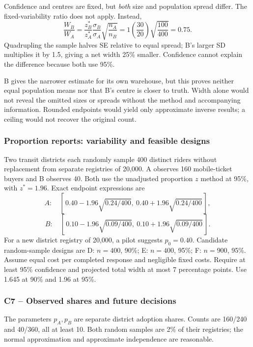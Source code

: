 Confidence and centres are fixed, but \emph{both} size and population spread differ. The fixed-variability ratio does not apply. Instead,
\[\frac{W_B}{W_A}=\frac{z_B^*}{z_A^*}\frac{\sigma_B}{\sigma_A}\sqrt{\frac{n_A}{n_B}}
=1\left(\frac{30}{20}\right)\sqrt{\frac{100}{400}}=0.75.\]
Quadrupling the sample halves SE relative to equal spread; B's larger SD multiplies it by 1.5, giving a net width 25\% smaller. Confidence cannot explain the difference because both use 95\%.

B gives the narrower estimate for its own warehouse, but this proves neither equal population means nor that B's centre is closer to truth. Width alone would not reveal the omitted sizes or spreads without the method and accompanying information. Rounded endpoints would yield only approximate inverse results; a ceiling would not recover the original count.
\clearpage
\subsubsection{Proportion reports: variability and feasible designs}\label{prob:c7-report-prop}
Two transit districts each randomly sample 400 distinct riders without replacement from separate registries of 20,000. A observes 160 mobile-ticket buyers and B observes 40. Both use the unadjusted proportion $z$ method at 95\%, with $z^*=1.96$. Exact endpoint expressions are
\[A:\quad [\,0.40-1.96\sqrt{0.24/400},\ 0.40+1.96\sqrt{0.24/400}\,],\]
\[B:\quad [\,0.10-1.96\sqrt{0.09/400},\ 0.10+1.96\sqrt{0.09/400}\,].\]
For a new district registry of 20,000, a pilot suggests $p_0=0.40$. Candidate random-sample designs are D: $n=400$, 90\%; E: $n=400$, 95\%; F: $n=900$, 95\%. Assume equal cost per completed response and negligible fixed costs. Require at least 95\% confidence and projected total width at most 7 percentage points. Use 1.645 at 90\% and 1.96 at 95\%.
\subsubsection*{C7 -- Observed shares and future decisions}\label{sol:c7-report-prop}
The parameters $p_A,p_B$ are separate district adoption shares. Counts are 160/240 and 40/360, all at least 10. Both random samples are 2\% of their registries; the normal approximation and approximate independence are reasonable.

